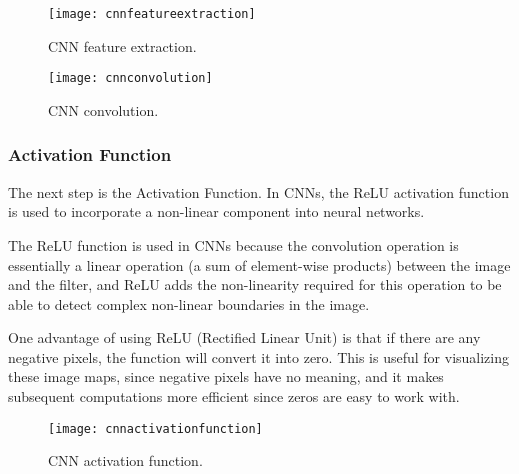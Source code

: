 	\begin{figure}[tbh]
		\centering
		\texttt{[image: cnnfeatureextraction]}
		\caption[CNN feature extraction]{CNN feature extraction.}
		\label{fig:cnnfeatureextraction}
	\end{figure}

	\begin{figure}[tbh]
		\centering
		\texttt{[image: cnnconvolution]}
		\caption[CNN convolution]{CNN convolution.}
		\label{fig:cnnconvolution}
	\end{figure}


	\subsubsection{Activation Function}
	\begin{bulletedlist}
		\item The next step is the Activation Function. In CNNs, the ReLU activation function is used to incorporate a non-linear component into neural networks.
		\item The ReLU function is used in CNNs because the convolution operation is essentially a linear operation (a sum of element-wise products) between the image and the filter, and ReLU adds the non-linearity required for this operation to be able to detect complex non-linear boundaries in the image.
		\item One advantage of using ReLU (Rectified Linear Unit) is that if there are any negative pixels, the function will convert it into zero. This is useful for visualizing these image maps, since negative pixels have no meaning, and it makes subsequent computations more efficient since zeros are easy to work with.
	\end{bulletedlist}

	\begin{figure}[tbh]
		\centering
		\texttt{[image: cnnactivationfunction]}
		\caption[CNN activation function]{CNN activation function.}
		\label{fig:cnnactivationfunction}
	\end{figure}


